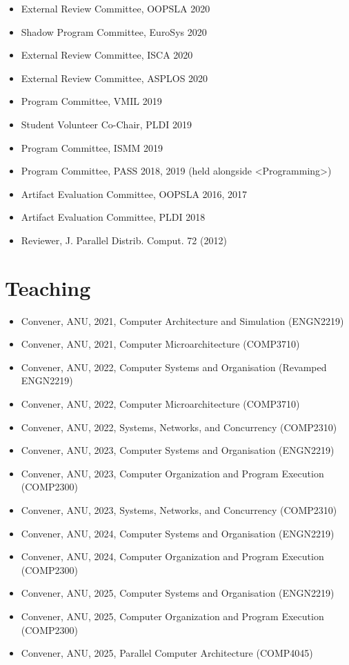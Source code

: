 \documentclass[singlecolumn,singlespace,11pt]{article}
\begin{document}
\begin{itemize}
\item External Review Committee, OOPSLA 2020
\item Shadow Program Committee, EuroSys 2020
\item External Review Committee, ISCA 2020
\item External Review Committee, ASPLOS 2020
\item Program Committee, VMIL 2019
\item Student Volunteer Co-Chair, PLDI 2019
\item Program Committee, ISMM 2019
\item Program Committee, PASS 2018, 2019 (held alongside <Programming>) 
\item Artifact Evaluation Committee, OOPSLA 2016, 2017 
\item Artifact Evaluation Committee, PLDI 2018
\item Reviewer, J. Parallel Distrib. Comput. 72 (2012) 
\end{itemize}

\section*{Teaching}
\begin{itemize}
\item Convener, ANU, 2021, Computer Architecture and Simulation (ENGN2219)
\item Convener, ANU, 2021, Computer Microarchitecture (COMP3710) 
\item Convener, ANU, 2022, Computer Systems and Organisation (Revamped ENGN2219)
\item Convener, ANU, 2022, Computer Microarchitecture (COMP3710) 
\item Convener, ANU, 2022, Systems, Networks, and Concurrency (COMP2310) 
\item Convener, ANU, 2023, Computer Systems and Organisation (ENGN2219) 
\item Convener, ANU, 2023, Computer Organization and Program Execution (COMP2300) 
\item Convener, ANU, 2023, Systems, Networks, and Concurrency (COMP2310) 
\item Convener, ANU, 2024, Computer Systems and Organisation (ENGN2219) 
\item Convener, ANU, 2024, Computer Organization and Program Execution (COMP2300)
\item Convener, ANU, 2025, Computer Systems and Organisation (ENGN2219) 
\item Convener, ANU, 2025, Computer Organization and Program Execution (COMP2300)
\item Convener, ANU, 2025, Parallel Computer Architecture (COMP4045) 
\end{itemize}
\end{document}
